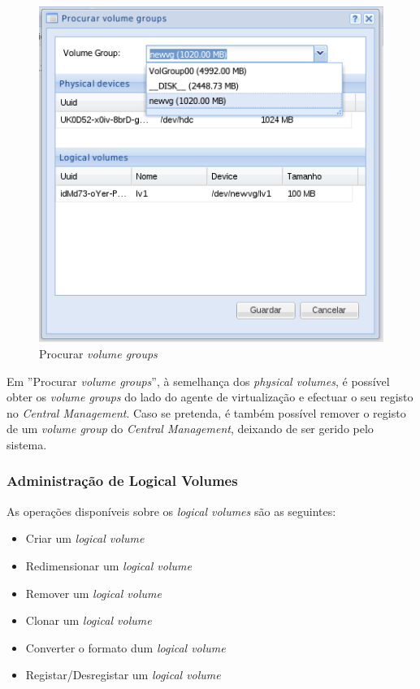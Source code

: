 \begin{figure}[H]
        \begin{center}
        \includegraphics[scale=0.45]{screenshots/node_storage_vg_search.png}
        \caption{Procurar \emph{volume groups}}
        \label{fig:storage_vg_search}
        \end{center}
\end{figure}

Em ''Procurar \emph{volume groups}'', à semelhança dos \emph{physical volumes}, é possível obter os \emph{volume groups} do lado do agente de virtualização e efectuar o seu registo no \emph{Central Management}.
Caso se pretenda, é também possível remover o registo de um \emph{volume group} do \emph{Central Management}, deixando de ser gerido pelo sistema.


\subsubsection{Administração de Logical Volumes}

As operações disponíveis sobre os \emph{logical volumes} são as seguintes:
\begin{itemize}
	\item Criar um \emph{logical volume}
	\item Redimensionar um \emph{logical volume}
	\item Remover um \emph{logical volume}
	\item Clonar um \emph{logical volume}
	\item Converter o formato dum \emph{logical volume}
    \item Registar/Desregistar um \emph{logical volume}
\end{itemize}

